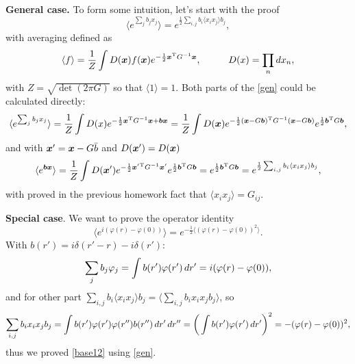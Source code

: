 \textbf{General case.} To form some intuition, let's start with the proof
\begin{equation}
	\langle e^{\sum_j b_j x_j}\rangle = e^{\frac{1}{2}\sum_{i,j} b_i \langle x_i x_j \rangle b_j},
	\label{gen}
\end{equation}
with averaging defined as
\begin{equation*}
	\langle f\rangle = \frac{1}{Z} \int D(\vc{x}) f(\vc{x}) e^{- \frac{1}{2} \vc{x}\T G^{-1} \vc{x}}, \hspace{10 mm} 
	D(x) = \prod_n d x_n,
\end{equation*}
with $Z = \sqrt{\det(2\pi G)}$ so that $\langle 1\rangle = 1$. Both parts of the \eqref{gen} could be calculated directly:
\begin{equation*}
	\langle e^{\sum_j b_j x_j}\rangle = 
	\frac{1}{Z} \int D(x) e^{-\frac{1}{2} \boldsymbol{x}^{\textnormal{T}} G^{-1} \boldsymbol{x} + \boldsymbol{b} \boldsymbol{x}} = \frac{1}{Z} \int D(\boldsymbol{x}) e^{- \frac{1}{2}(\boldsymbol{x}-G \boldsymbol{b})^{\textnormal{T}} G^{-1} (\boldsymbol{x}-G \boldsymbol{b})}e^{\frac{1}{2} \boldsymbol{b}^{\textnormal{T}} G \boldsymbol{b}},
\end{equation*}
and with $\boldsymbol{x}' = \boldsymbol{x} - G \bar{b}$ and $D(\boldsymbol{x}') = D(\boldsymbol{x})$ 
\begin{equation*}
	\langle e^{\boldsymbol{b} \boldsymbol{x}}\rangle = \frac{1}{Z} \int D(\boldsymbol{x}') e^{- \frac{1}{2} \boldsymbol{x}'{}^{\textnormal{T}} G^{-1} \boldsymbol{x}'} e^{\frac{1}{2} \boldsymbol{b}^{\textnormal{T}} G \boldsymbol{b}} = e^{\frac{1}{2} \boldsymbol{b}^{\textnormal{T}} G \boldsymbol{b}} = e^{\frac{1}{2} \sum_{i,j} b_i \langle x_i x_j\rangle b_j},
\end{equation*}
with proved in the previous homework fact that $\langle x_i x_j\rangle = G_{ij}$.

\textbf{Special case}. We want to prove the operator identity
\begin{equation}
	\langle e^{i(\varphi(r)-\varphi(0))}\rangle = e^{- \frac{1}{2} \langle (\varphi(r)-\varphi(0))^2\rangle}.
	\label{base12}
\end{equation}
With $b(r') = i \delta(r'-r) - i \delta(r')$:
\begin{equation*}
	\sum_j b_j \varphi_j = \int b(r') \varphi(r') \, d r' = i (\varphi(r)-\varphi(0)),
\end{equation*}
and for other part $\sum_{i,j} b_i \langle x_i x_j\rangle b_j = \langle  \sum_{i,j} b_i  x_i x_j b_j\rangle$, so
\begin{equation*}
	\sum_{i,j} b_i  x_i x_j b_j = \int
	b(r') \varphi(r') \varphi(r'') b(r'')
	\, d r' \, d r'' = \bigg(
		\int b(r') \varphi(r') \, d r'
	\bigg)^2 = - (\varphi(r)-\varphi(0))^2,
\end{equation*}
thus we proved \eqref{base12} using \eqref{gen}.